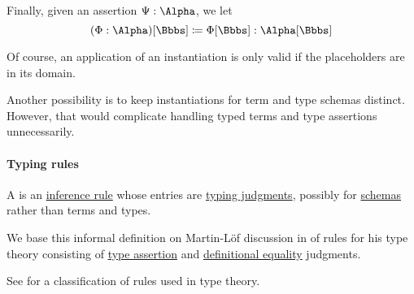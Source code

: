 \begin{definition}
\begin{thmenum}
     Finally, given an assertion \( \Psi: \Alpha \), we let
    \begin{equation}\label{eq:def:lambda_schema_instantiation/assertion}
      (\Phi: \Alpha)[\Bbbs] \coloneqq \Phi[\Bbbs]: \Alpha[\Bbbs]
    \end{equation}
  \end{thmenum}
\end{definition}
\begin{comments}
  \item Of course, an application of an instantiation is only valid if the placeholders are in its domain.

  \item Another possibility is to keep instantiations for term and type schemas distinct. However, that would complicate handling typed terms and type assertions unnecessarily.
\end{comments}

\paragraph{Typing rules}

\begin{concept}\label{con:typing_rule}
  A  is an \hyperref[def:inference_rule]{inference rule} whose entries are \hyperref[rem:typing_judgments]{typing judgments}, possibly for \hyperref[con:schemas_and_instances]{schemas} rather than terms and types.
\end{concept}
\begin{comments}
  \item We base this informal definition on Martin-L\"of discussion in \cite{MartinLöf1984IntuitionisticTypeTheory} of rules for his type theory consisting of \hyperref[def:type_assertion]{type assertion} and \hyperref[con:definitional_equality]{definitional equality} judgments.

  \item See  for a classification of rules used in type theory.
\end{comments}


